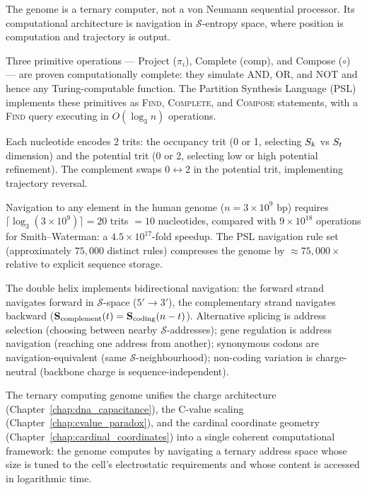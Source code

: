 \begin{chapterbox}
The genome is a ternary computer, not a von Neumann sequential processor.
Its computational architecture is navigation in $\mathcal{S}$-entropy
space, where position is computation and trajectory is output.

Three primitive operations --- Project ($\pi_i$), Complete (comp), and
Compose ($\circ$) --- are proven computationally complete: they simulate
AND, OR, and NOT and hence any Turing-computable function. The Partition
Synthesis Language (PSL) implements these primitives as \textsc{Find},
\textsc{Complete}, and \textsc{Compose} statements, with a \textsc{Find}
query executing in $O(\log_3 n)$ operations.

Each nucleotide encodes 2 trits: the occupancy trit (0 or 1, selecting
$S_k$ vs $S_t$ dimension) and the potential trit (0 or 2, selecting
low or high potential refinement). The complement swaps $0 \leftrightarrow 2$
in the potential trit, implementing trajectory reversal.

Navigation to any element in the human genome ($n = 3\times 10^9$ bp)
requires $\lceil\log_3(3\times 10^9)\rceil = 20$ trits $= 10$ nucleotides,
compared with $9\times 10^{18}$ operations for Smith--Waterman: a
$4.5\times 10^{17}$-fold speedup. The PSL navigation rule set (approximately
$75{,}000$ distinct rules) compresses the genome by $\approx 75{,}000\times$
relative to explicit sequence storage.

The double helix implements bidirectional navigation: the forward strand
navigates forward in $\mathcal{S}$-space ($5' \to 3'$), the complementary
strand navigates backward ($\mathbf{S}_{\mathrm{complement}}(t) =
\mathbf{S}_{\mathrm{coding}}(n-t)$). Alternative splicing is address
selection (choosing between nearby $\mathcal{S}$-addresses); gene
regulation is address navigation (reaching one address from another);
synonymous codons are navigation-equivalent (same $\mathcal{S}$-neighbourhood);
non-coding variation is charge-neutral (backbone charge is
sequence-independent).

The ternary computing genome unifies the charge architecture
(Chapter~\ref{chap:dna_capacitance}), the C-value scaling
(Chapter~\ref{chap:cvalue_paradox}), and the cardinal coordinate
geometry (Chapter~\ref{chap:cardinal_coordinates}) into a single
coherent computational framework: the genome computes by navigating
a ternary address space whose size is tuned to the cell's
electrostatic requirements and whose content is accessed in
logarithmic time.
\end{chapterbox}
